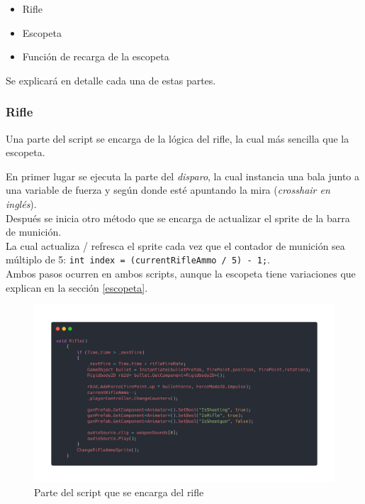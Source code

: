 \documentclass[12pt]{article}
\begin{document}
        \begin{itemize}
            \item Rifle 
            \item Escopeta
            \item Función de recarga de la escopeta
        \end{itemize}
        Se explicará en detalle cada una de estas partes.\\
        \newpage

        \subsubsection{Rifle} \label{rifle}
            Una parte del script se encarga de la lógica del rifle, la cual más sencilla que la escopeta.

            En primer lugar se ejecuta la parte del \textit{disparo}, la cual instancia una bala junto a una variable de fuerza y según donde esté apuntando la mira (\textit{crosshair en inglés}).\\

            Después se inicia otro método que se encarga de actualizar el sprite de la barra de munición.\\ 
            La cual actualiza / refresca el sprite cada vez que el contador de munición sea múltiplo de 5: \texttt{int index = (currentRifleAmmo / 5) - 1;}. \\

            Ambos pasos ocurren en ambos scripts, aunque la escopeta tiene variaciones que explican en la sección \ref{escopeta}.

            \begin{figure}[H]
                \centering
                \includegraphics[width=\textwidth]{Images/ShootyMacShooty/rilfe.png}
                \caption{Parte del script que se encarga del rifle}
            \end{figure}
\end{document}
